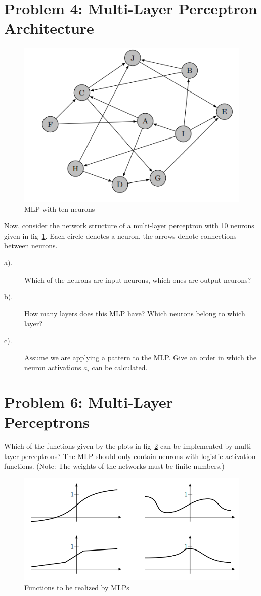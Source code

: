 \documentclass[12pt]{article}
\begin{document}
\section{Problem 4: Multi-Layer Perceptron Architecture}

\begin{figure}[!htbp]
	\centering
	\includegraphics[width=.55\textwidth]{fig/2018-03-19-13-54-31.png}
	\caption{MLP with ten neurons} \label{fig:mlp2} 
\end{figure}

Now, consider the network structure of a multi-layer perceptron with 10 neurons given in
fig~\ref{fig:mlp2}. Each circle denotes a neuron, the arrows denote connections between neurons.
\begin{description}
	\item[a).]  Which of the neurons are input neurons, which ones are output neurons?
	\item[b).] How many layers does this MLP have? Which neurons belong to which layer?
	\item[c).] Assume we are applying a pattern to the MLP. Give an order in which the neuron
	activations $a_i$ can be calculated.
\end{description}

\section{Problem 6: Multi-Layer Perceptrons}

Which of the functions given by the plots in fig~\ref{fig:mlp3} can be implemented by multi-layer
perceptrons? The MLP should only contain neurons with logistic activation functions.
(Note: The weights of the networks must be finite numbers.)

\begin{figure}
	\centering 

\includegraphics[width=.75\textwidth]{fig/2018-03-19-13-57-32.png}
\caption{Functions to be realized by MLPs} \label{fig:mlp3} 
\end{figure}
\end{document}
